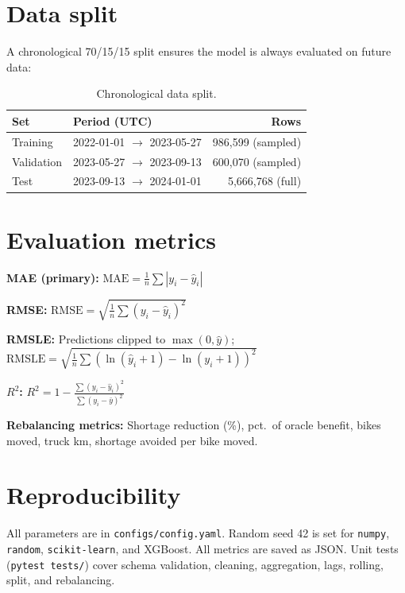 \documentclass[12pt,a4paper]{report}
\begin{document}
\section{Data split}

A chronological 70/15/15 split ensures the model is always evaluated on
future data:

\begin{table}[H]
\centering
\caption{Chronological data split.}
\label{tab:split}
\small
\begin{tabular}{@{}llr@{}}
\toprule
\textbf{Set} & \textbf{Period (UTC)} & \textbf{Rows} \\
\midrule
Training & 2022-01-01 $\to$ 2023-05-27 & 986{,}599 (sampled) \\
Validation & 2023-05-27 $\to$ 2023-09-13 & 600{,}070 (sampled) \\
Test & 2023-09-13 $\to$ 2024-01-01 & 5{,}666{,}768 (full) \\
\bottomrule
\end{tabular}
\end{table}

\section{Evaluation metrics}

\textbf{MAE (primary):}
$\text{MAE} = \frac{1}{n}\sum |y_i - \hat{y}_i|$

\textbf{RMSE:}
$\text{RMSE} = \sqrt{\frac{1}{n}\sum (y_i - \hat{y}_i)^2}$

\textbf{RMSLE:} Predictions clipped to $\max(0, \hat{y})$;
$\text{RMSLE} = \sqrt{\frac{1}{n}\sum (\ln(\hat{y}_i+1)-\ln(y_i+1))^2}$

\textbf{$R^2$:}
$R^2 = 1 - \frac{\sum (y_i-\hat{y}_i)^2}{\sum (y_i-\bar{y})^2}$

\textbf{Rebalancing metrics:} Shortage reduction (\%), pct.\ of oracle
benefit, bikes moved, truck km, shortage avoided per bike moved.

\section{Reproducibility}

All parameters are in \texttt{configs/config.yaml}. Random seed 42 is
set for \texttt{numpy}, \texttt{random}, \texttt{scikit-learn}, and
XGBoost. All metrics are saved as JSON. Unit tests
(\texttt{pytest tests/}) cover schema validation, cleaning,
aggregation, lags, rolling, split, and rebalancing.
\end{document}
